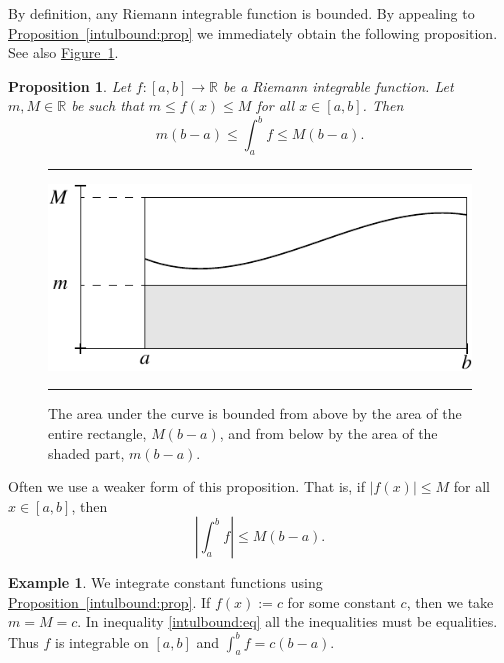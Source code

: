 \documentclass[12pt]{book}
\newenvironment{myfigureht}{%
\begin{figure}[h!t]
\noindent\rule{\textwidth}{0.4pt}\vspace{12pt}\par\centering}%
{\par\noindent\rule{\textwidth}{0.4pt}
\end{figure}}
\newcommand{\abs}[1]{\left\lvert {#1} \right\rvert}
\newcommand{\R}{{\mathbb{R}}}
\theoremstyle{plain}
\newtheorem{prop}[thm]{Proposition}
\theoremstyle{remark}
\theoremstyle{definition}
\theoremstyle{exercise}
\theoremstyle{example}
\newtheorem{example}[thm]{Example}
\newcommand{\figureref}[1]{\hyperref[#1]{Figure~\ref*{#1}}}
\newcommand{\propref}[1]{\hyperref[#1]{Proposition~\ref*{#1}}}
\begin{document}
By definition, any Riemann integrable function is bounded.
By appealing to \propref{intulbound:prop} we immediately obtain
the following proposition.  See also \figureref{fig:integralminmax}.

\begin{prop} \label{intbound:prop}
Let $f \colon [a,b] \to \R$ be a Riemann integrable function.
Let $m, M \in \R$ be 
such that $m \leq f(x) \leq M$ for all $x \in [a,b]$.  Then
\begin{equation*}
m(b-a) \leq
\int_a^b f
\leq M(b-a) .
\end{equation*}
\end{prop}
\begin{myfigureht}
\includegraphics{figures/integralminmax}
\caption{The area under the curve is bounded from above by
the area of the entire rectangle, $M(b-a)$, and from below by
the area of the shaded part, $m(b-a)$.\label{fig:integralminmax}}
\end{myfigureht}

Often we use a weaker form of this proposition.  That is, if
$\abs{f(x)} \leq M$ for all $x \in [a,b]$, then
\begin{equation*}
\abs{\int_a^b f} \leq M(b-a) .
\end{equation*}

\begin{example}
We integrate constant functions using
\propref{intulbound:prop}.
If $f(x) := c$ for some constant $c$, then we take $m = M = c$.
In inequality \eqref{intulbound:eq}
all the inequalities must be equalities.
Thus $f$ is integrable on $[a,b]$ and $\int_a^b f = c(b-a)$.
\end{example}
\end{document}

